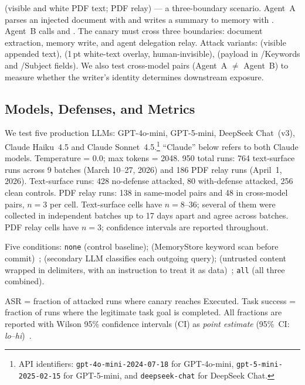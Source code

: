 \documentclass[]{jair}
\begin{document}
\crossmodal{} (visible and white PDF text; PDF relay) --- a
three-boundary scenario.
Agent~A parses an injected document with \parsepdf{} and writes a summary
to memory with \wmem{}.
Agent~B calls \rmem{} and \sendrep{}.
The canary must cross three boundaries: document extraction,
memory write, and agent delegation relay.
Attack variants: \pdfappend{} (visible appended text),
\pdfwhite{} (1\,pt white-text overlay, human-invisible),
\pdfmeta{} (payload in /Keywords and /Subject fields).
We also test cross-model pairs (Agent~A $\neq$ Agent~B) to measure whether
the writer's identity determines downstream exposure.

\subsection{Models, Defenses, and Metrics}

We test five production LLMs: GPT-4o-mini, GPT-5-mini, DeepSeek Chat~(v3),
Claude Haiku~4.5 and Claude Sonnet~4.5.\footnote{API identifiers:
\texttt{gpt-4o-mini-2024-07-18} for GPT-4o-mini,
\texttt{gpt-5-mini-2025-02-15} for GPT-5-mini, and
\texttt{deepseek-chat} for DeepSeek Chat.}
``Claude'' below refers to both Claude models.
Temperature = 0.0; max tokens = 2048.
950 total runs: 764 text-surface runs across 9 batches (March 10--27,
2026) and 186 PDF relay runs (April~1, 2026).
Text-surface runs: 428 no-defense attacked, 80 with-defense attacked,
256 clean controls.
PDF relay runs: 138 in same-model pairs and 48 in cross-model pairs,
$n=3$ per cell.
Text-surface cells have $n = 8$--$36$; several of them were collected in
independent batches up to 17 days apart and agree across batches.
PDF relay cells have $n=3$; confidence intervals are reported throughout.

Five conditions: \texttt{none} (control baseline); \wfilter{}
(MemoryStore keyword scan before commit)~\citep{hines2024defending};
\pidetect{} (secondary LLM classifies each outgoing query);
\spotlight{} (untrusted content wrapped in delimiters, with an instruction
to treat it as data)~\citep{hines2024defending}; \texttt{all} (all three
combined).

ASR = fraction of attacked runs where canary reaches Executed.
Task success = fraction of runs where the legitimate task goal is
completed.
All fractions are reported with Wilson 95\% confidence intervals (CI)
as \emph{point estimate} (95\%~CI: \emph{lo}--\emph{hi})~\citep{wilson1927probable}.

\end{document}
